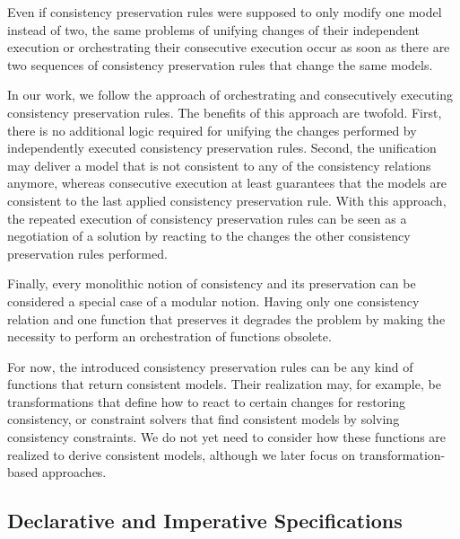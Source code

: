 Even if consistency preservation rules were supposed to only modify one model instead of two, the same problems of unifying changes of their independent execution or orchestrating their consecutive execution occur as soon as there are two sequences of consistency preservation rules that change the same models.

In our work, we follow the approach of orchestrating and consecutively executing consistency preservation rules.
The benefits of this approach are twofold. First, there is no additional logic required for unifying the changes performed by independently executed consistency preservation rules. 
Second, the unification may deliver a model that is not consistent to any of the consistency relations anymore, whereas consecutive execution at least guarantees that the models are consistent to the last applied consistency preservation rule.
With this approach, the repeated execution of consistency preservation rules can be seen as a negotiation of a solution by reacting to the changes the other consistency preservation rules performed.

\begin{remark} 
Finally, every monolithic notion of consistency and its preservation can be considered a special case of a modular notion. Having only one consistency relation and one function that preserves it degrades the problem by making the necessity to perform an orchestration of functions obsolete.
\end{remark}

For now, the introduced consistency preservation rules can be any kind of functions that return consistent models. 
Their realization may, for example, be transformations that define how to react to certain changes for restoring consistency, or constraint solvers that find consistent models by solving consistency constraints. 
We do not yet need to consider how these functions are realized to derive consistent models, although we later focus on transformation-based approaches.


\subsection{Declarative and Imperative Specifications}
\label{chap:correctness:notions_consistency:declarative_imperative}

